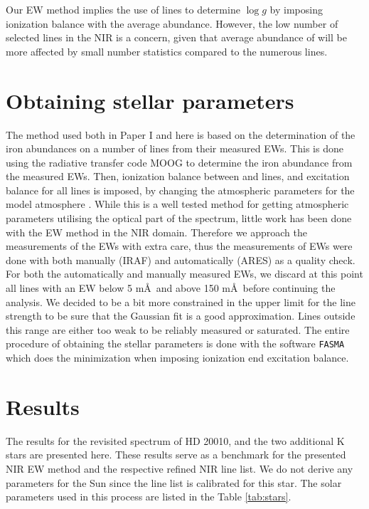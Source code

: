 \documentclass[a4paper,fleqn,usenatbib]{mnras}
\begin{document}
Our EW method implies the use of  lines to determine $\log g$ by imposing ionization balance with the average 
abundance. However, the low number of selected  lines in the NIR is a concern, given that average
abundance of  will be more affected by small number statistics compared to the numerous  lines.


\section{Obtaining stellar parameters}
\label{sec:method}

The method used both in Paper I and here is based on the determination of the iron abundances on a
number of lines from their measured EWs. This is done using the radiative transfer code MOOG
\citep{Sneden1973} to determine the iron abundance from the measured EWs. Then, ionization balance
between  and  lines, and excitation balance for all  lines is
imposed, by changing the atmospheric parameters for the model atmosphere \citep[][ATLAS9 is used
here]{Kurucz1993}. While this is a well tested method for getting atmospheric parameters utilising
the optical part of the spectrum, little work has been done with the EW method in the NIR
domain. Therefore we approach the measurements of the EWs with extra care, thus the measurements of
EWs were done with both manually (IRAF) and automatically (ARES) as a quality check. For both the
automatically and manually measured EWs, we discard at this point all lines with an EW below
5 m\AA\ and above 150 m\AA\ before continuing the analysis. We decided to be a bit
more constrained in the upper limit for the line strength to be sure that the Gaussian fit is a good
approximation. Lines outside this range are either too weak to be reliably measured or saturated.
The entire procedure of obtaining the stellar parameters is done with the software \texttt{FASMA}
\citep{Andreasen2017a} which does the minimization when imposing ionization end excitation balance.



\section{Results}
\label{sec:results}

The results for the revisited spectrum of HD 20010, and the two additional K stars are
presented here. These results serve as a benchmark for the presented NIR EW method and the
respective refined NIR line list. We do not derive any parameters for the Sun since the line list is
calibrated for this star. The solar parameters used in this process are listed in the Table \ref{tab:stars}.
\end{document}
